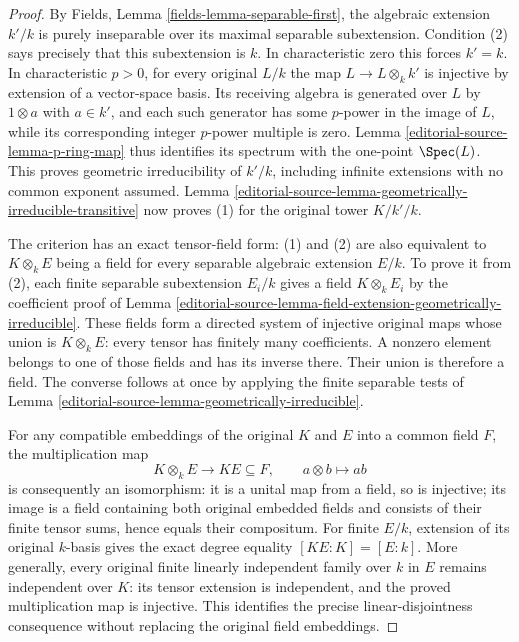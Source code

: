 \begin{proof}
By Fields, Lemma
\ref{fields-lemma-separable-first},
the algebraic extension $k'/k$
is purely inseparable over its
maximal separable subextension.
Condition (2) says precisely
that this subextension is $k$.
In characteristic zero this
forces $k'=k$. In characteristic
$p>0$, for every original $L/k$
the map $L\to L\otimes_k k'$
is injective by extension of
a vector-space basis. Its
receiving algebra is generated
over $L$ by $1\otimes a$ with
$a\in k'$, and each such
generator has some $p$-power
in the image of $L$, while
its corresponding integer
$p$-power multiple is zero.
Lemma \ref{editorial-source-lemma-p-ring-map}
thus identifies its spectrum
with the one-point $\Spec(L)$.
This proves geometric
irreducibility of $k'/k$,
including infinite extensions
with no common exponent assumed.
Lemma
\ref{editorial-source-lemma-geometrically-irreducible-transitive}
now proves (1) for the original
tower $K/k'/k$.

The criterion has an exact
tensor-field form: (1) and (2)
are also equivalent to
$K\otimes_k E$ being a field
for every separable algebraic
extension $E/k$. To prove it
from (2), each finite separable
subextension $E_i/k$ gives a
field $K\otimes_k E_i$ by the
coefficient proof of Lemma
\ref{editorial-source-lemma-field-extension-geometrically-irreducible}.
These fields form a directed
system of injective original
maps whose union is
$K\otimes_k E$: every tensor
has finitely many coefficients.
A nonzero element belongs to
one of those fields and has
its inverse there. Their union
is therefore a field. The
converse follows at once by
applying the finite separable
tests of Lemma
\ref{editorial-source-lemma-geometrically-irreducible}.

For any compatible embeddings
of the original $K$ and $E$
into a common field $F$, the
multiplication map
$$
K\otimes_k E\longrightarrow KE\subseteq F,
\qquad a\otimes b\longmapsto ab
$$
is consequently an isomorphism:
it is a unital map from a field,
so is injective; its image is
a field containing both original
embedded fields and consists of
their finite tensor sums, hence
equals their compositum.
For finite $E/k$, extension of
its original $k$-basis gives
the exact degree equality
$[KE:K]=[E:k]$. More generally,
every original finite linearly
independent family over $k$
in $E$ remains independent
over $K$: its tensor extension
is independent, and the proved
multiplication map is injective.
This identifies the precise
linear-disjointness consequence
without replacing the original
field embeddings.
\end{proof}